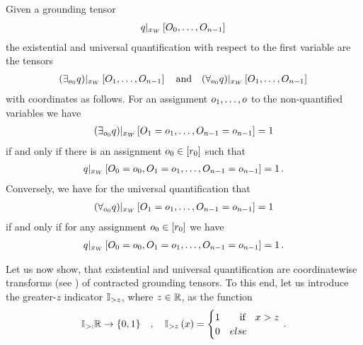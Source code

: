 \begin{definition}
    Given a grounding tensor
    \begin{align*}
        {q}|_{x_{W}} \left[O_{0},\ldots,O_{n-1}\right] \,
    \end{align*}
    the existential and universal quantification with respect to the first variable are the tensors
    \begin{align*}
        {\left(\exists_{o_{0}}q\right)}|_{x_{W}} \left[O_{1},\ldots,O_{n-1}\right] \quad \text{and} \quad
        {\left(\forall_{o_{0}}q\right)}|_{x_{W}} \left[O_{1},\ldots,O_{n-1}\right] \,
    \end{align*}
    with coordinates as follows.
    For an assignment $o_{1},\ldots,o$ to the non-quantified variables we have
    \begin{align*}
        {\left(\exists_{o_{0}}q\right)}|_{x_{W}} \left[O_{1}=o_{1},\ldots,O_{n-1}=o_{n-1}\right] = 1
    \end{align*}
    if and only if there is an assignment $o_{0}\in[r_{0}]$ such that
    \begin{align*}
        {q}|_{x_{W}} \left[O_{0}=o_{0},O_{1}=o_{1},\ldots,O_{n-1}=o_{n-1}\right] = 1 \, .
    \end{align*}
    Conversely, we have for the universal quantification that
    \begin{align*}
        {\left(\forall_{o_{0}}q\right)}|_{x_{W}} \left[O_{1}=o_{1},\ldots,O_{n-1}=o_{n-1}\right] = 1
    \end{align*}
    if and only if for any assignment $o_{0}\in[r_{0}]$ we have
    \begin{align*}
        {q}|_{x_{W}} \left[O_{0}=o_{0},O_{1}=o_{1},\ldots,O_{n-1}=o_{n-1}\right] = 1 \, .
    \end{align*}
\end{definition}


Let us now show, that existential and universal quantification are coordinatewise transforms (see ) of contracted grounding tensors.
To this end, let us introduce the greater-$z$ indicator $\mathbb{I}_{>z}$, where $z\in\mathbb{R}$, as the function
\begin{align*}
    \mathbb{I}_{>:} \mathbb{R} \rightarrow \{0,1\}
    \quad, \quad \mathbb{I}_{>z}\left(x\right) =
    \begin{cases}
        1 & \quad  \text{if} \quad x > z\\
        0 & else
    \end{cases} \, .
\end{align*}

